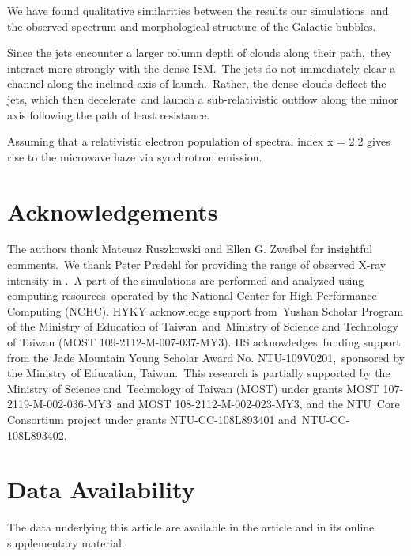 \documentclass[twocolumn]{aastex631}
\begin{document}
We have found qualitative similarities between the results our simulations\
and the observed spectrum and morphological structure of the Galactic bubbles.


Since the jets encounter a larger column depth of clouds along their path,\
they interact more strongly with the dense ISM.\
The jets do not immediately clear a channel along the inclined axis of launch.\
Rather, the dense clouds deflect the jets, which then decelerate\
and launch a sub-relativistic outflow along the minor axis following the path of least resistance.

Assuming that a relativistic electron population of spectral
index x = 2.2 gives rise to the microwave haze via synchrotron
emission.




\section{Acknowledgements}
The authors thank Mateusz Ruszkowski and Ellen G. Zweibel for insightful comments.\
We thank Peter Predehl for providing the range of observed X-ray intensity in .\
A part of the simulations are performed and analyzed using computing resources\
operated by the National Center for High Performance Computing (NCHC).
HYKY acknowledge support from\
Yushan Scholar Program of the Ministry of Education of Taiwan\
and\
Ministry of Science and Technology of Taiwan (MOST 109-2112-M-007-037-MY3).
HS acknowledges\
funding support from the Jade Mountain Young Scholar Award No. NTU-109V0201,\
sponsored by the Ministry of Education, Taiwan.\
This research is partially supported by the Ministry of Science and\
Technology of Taiwan (MOST) under grants MOST 107-2119-M-002-036-MY3\
and MOST 108-2112-M-002-023-MY3, and the NTU\
Core Consortium project under grants NTU-CC-108L893401 and\
NTU-CC-108L893402.

\section*{Data Availability}
The data underlying this article are available in the article and in its online supplementary material.






\end{document}
